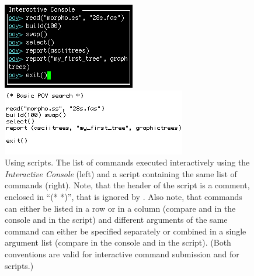 \begin{figure}
\centering
\begin{minipage}[c]{0.42\textwidth}
   		\includegraphics[width=\textwidth]{doc/figures/commandlist.jpg}
\end{minipage}
\quad
\begin{minipage}[c]{0.53\textwidth}
	   	\includegraphics[width=\textwidth]{doc/figures/script.jpg}
   	\end{minipage}
\caption{Using \poy scripts. The list of commands executed interactively using the \emph{Interactive Console} (left) and a script containing the same list of commands (right). Note, that the header of the script is a comment, enclosed in ``(* *)'', that is ignored by \poy. Also note, that commands can either be listed in a row or in a column (compare  and  in the console and in the script) and different arguments of the same command can either be specified separately or combined in a single argument list (compare  in the console and in the script). (Both conventions are valid for interactive command submission and for scripts.)}
\label{fig:script}
\end{figure}

